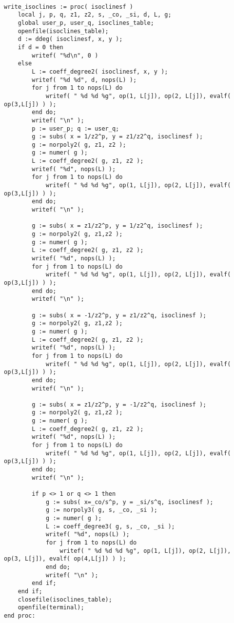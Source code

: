 \documentclass[a4paper,10pt]{article}
\begin{document}
\begin{lstlisting}[name=writelog3]

write_isoclines := proc( isoclinesf )
    local j, p, q, z1, z2, s, _co, _si, d, L, g;
    global user_p, user_q, isoclines_table;
    openfile(isoclines_table);
    d := ddeg( isoclinesf, x, y );
    if d = 0 then
        writef( "%d\n", 0 )
    else
        L := coeff_degree2( isoclinesf, x, y );
        writef( "%d %d", d, nops(L) );
        for j from 1 to nops(L) do
            writef( " %d %d %g", op(1, L[j]), op(2, L[j]), evalf( op(3,L[j]) ) );
        end do;
        writef( "\n" );
        p := user_p; q := user_q;
        g := subs( x = 1/z2^p, y = z1/z2^q, isoclinesf );
        g := norpoly2( g, z1, z2 );
        g := numer( g );
        L := coeff_degree2( g, z1, z2 );
        writef( "%d", nops(L) );
        for j from 1 to nops(L) do
            writef( " %d %d %g", op(1, L[j]), op(2, L[j]), evalf( op(3,L[j]) ) );
        end do;
        writef( "\n" );

        g := subs( x = z1/z2^p, y = 1/z2^q, isoclinesf );
        g := norpoly2( g, z1,z2 );
        g := numer( g );
        L := coeff_degree2( g, z1, z2 );
        writef( "%d", nops(L) );
        for j from 1 to nops(L) do
            writef( " %d %d %g", op(1, L[j]), op(2, L[j]), evalf( op(3,L[j]) ) );
        end do;
        writef( "\n" );

        g := subs( x = -1/z2^p, y = z1/z2^q, isoclinesf );
        g := norpoly2( g, z1,z2 );
        g := numer( g );
        L := coeff_degree2( g, z1, z2 );
        writef( "%d", nops(L) );
        for j from 1 to nops(L) do
            writef( " %d %d %g", op(1, L[j]), op(2, L[j]), evalf( op(3,L[j]) ) );
        end do;
        writef( "\n" );

        g := subs( x = z1/z2^p, y = -1/z2^q, isoclinesf );
        g := norpoly2( g, z1,z2 );
        g := numer( g );
        L := coeff_degree2( g, z1, z2 );
        writef( "%d", nops(L) );
        for j from 1 to nops(L) do
            writef( " %d %d %g", op(1, L[j]), op(2, L[j]), evalf( op(3,L[j]) ) );
        end do;
        writef( "\n" );

        if p <> 1 or q <> 1 then
            g := subs( x=_co/s^p, y = _si/s^q, isoclinesf );
            g := norpoly3( g, s, _co, _si );
            g := numer( g );
            L := coeff_degree3( g, s, _co, _si );
            writef( "%d", nops(L) );
            for j from 1 to nops(L) do
                writef( " %d %d %d %g", op(1, L[j]), op(2, L[j]), op(3, L[j]), evalf( op(4,L[j]) ) );
            end do;
            writef( "\n" );
        end if;
    end if;
    closefile(isoclines_table);
    openfile(terminal);
end proc:
\end{lstlisting}
\end{document}
